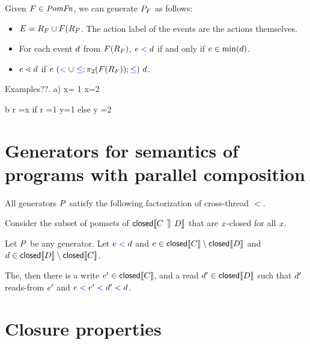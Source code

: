 \begin{definition}
Given $F \in \mathit{PomFn}$, we can generate $P_{F}$ as follows:
\begin{itemize}
\item $E = R_{F} \cup F(R_{F}$.  The action label of the events are the actions themselves.  
\item For each event $d$ from $F(R_{F})$, $e \mathrel{{\color{blue}<}} d$ if and only if $e \in \min(d)$.
\item $e \lessdot d$ if $ e\ (\mathrel{{\color{blue}<}} \cup \mathrel{{\color{blue}\leq}};\pi_2(F(R_{F})); \mathrel{{\color{blue}\leq}}) \  d$.
\end{itemize}
\end{definition}

Examples??.  
a) x= 1
x=2

b  r =x
   if r =1  {y=1}
   else      {y =2}

\section{Generators for semantics of programs with parallel composition}
All generators $P$  satisfy the following factorization of cross-thread $\lt$.  

\begin{lemma}\label{pargen}
Consider the subset of pomsets of $\textsf{closed}\llbracket C \,\mathbin{\rrceil}\, D\rrbracket$ that are  $x$-closed for all $x$.  

Let $P$  be any generator.  Let $e\mathrel{{\color{blue}<}}d$ and $e \in \textsf{closed}\llbracket C\rrbracket \setminus \textsf{closed}\llbracket D\rrbracket$ and  $d \in \textsf{closed}\llbracket D\rrbracket \setminus \textsf{closed}\llbracket C\rrbracket$.  

The,  then there is a write  $e' \in \textsf{closed}\llbracket C\rrbracket$, and  a read $d' \in \textsf{closed}\llbracket D\rrbracket$ such that  $d'$ reads-from $e'$ and $e \mathrel{{\color{blue}<}} e' \mathrel{{\color{blue}<}} d' \mathrel{{\color{blue}<}} d$. 



\end{lemma}

\section{Closure properties}


